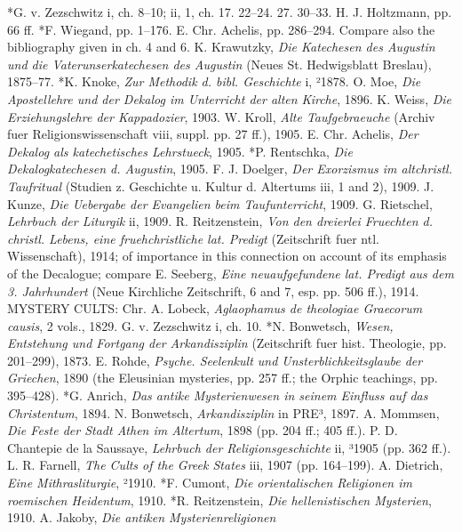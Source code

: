 *G. v. Zezschwitz i, ch. 8–10; ii, 1, ch. 17. 22–24. 27. 30–33. H. J. Holtzmann, pp. 66 ff. *F. Wiegand, pp. 1–176. E. Chr. Achelis, pp. 286–294. Compare also the bibliography given in ch. 4 and 6. K. Krawutzky, \emph{Die Katechesen des Augustin und die Vaterunserkatechesen des Augustin} (Neues St. Hedwigsblatt Breslau), 1875–77. *K. Knoke, \emph{Zur Methodik d. bibl. Geschichte} i, ²1878. O. Moe, \emph{Die Apostellehre und der Dekalog im Unterricht der alten Kirche}, 1896. K. Weiss, \emph{Die Erziehungslehre der Kappadozier}, 1903. W. Kroll, \emph{Alte Taufgebraeuche} (Archiv fuer Religionswissenschaft viii, suppl. pp. 27 ff.), 1905. E. Chr. Achelis, \emph{Der Dekalog als katechetisches Lehrstueck}, 1905. *P. Rentschka, \emph{Die Dekalogkatechesen d. Augustin}, 1905. F. J. Doelger, \emph{Der Exorzismus im altchristl. Taufritual} (Studien z. Geschichte u. Kultur d. Altertums iii, 1 and 2), 1909. J. Kunze, \emph{Die Uebergabe der Evangelien beim Taufunterricht}, 1909. G. Rietschel, \emph{Lehrbuch der Liturgik} ii, 1909. R. Reitzenstein, \emph{Von den dreierlei Fruechten d. christl. Lebens, eine fruehchristliche lat. Predigt} (Zeitschrift fuer ntl. Wissenschaft), 1914; of importance in this connection on account of its emphasis of the Decalogue; compare E. Seeberg, \emph{Eine neuaufgefundene lat. Predigt aus dem 3. Jahrhundert} (Neue Kirchliche Zeitschrift, 6 and 7, esp. pp. 506 ff.), 1914. MYSTERY CULTS: Chr. A. Lobeck, \emph{Aglaophamus de theologiae Graecorum causis}, 2 vols., 1829. G. v. Zezschwitz i, ch. 10. *N. Bonwetsch, \emph{Wesen, Entstehung und Fortgang der Arkandisziplin} (Zeitschrift fuer hist. Theologie, pp. 201–299), 1873. E. Rohde, \emph{Psyche. Seelenkult und Unsterblichkeitsglaube der Griechen}, 1890 (the Eleusinian mysteries, pp. 257 ff.; the Orphic teachings, pp. 395–428). *G. Anrich, \emph{Das antike Mysterienwesen in seinem Einfluss auf das Christentum}, 1894. N. Bonwetsch, \emph{Arkandisziplin} in PRE³, 1897. A. Mommsen, \emph{Die Feste der Stadt Athen im Altertum}, 1898 (pp. 204 ff.; 405 ff.). P. D. Chantepie de la Saussaye, \emph{Lehrbuch der Religionsgeschichte} ii, ³1905 (pp. 362 ff.). L. R. Farnell, \emph{The Cults of the Greek States} iii, 1907 (pp. 164–199). A. Dietrich, \emph{Eine Mithrasliturgie}, ²1910. *F. Cumont, \emph{Die orientalischen Religionen im roemischen Heidentum}, 1910. *R. Reitzenstein, \emph{Die hellenistischen Mysterien}, 1910. A. Jakoby, \emph{Die antiken Mysterienreligionen}

